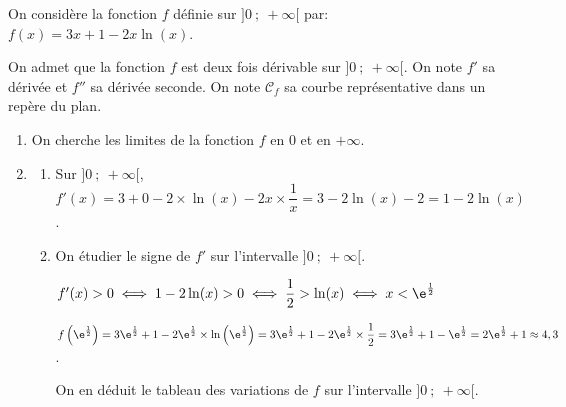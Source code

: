 \medskip

On considère la fonction $f$ définie sur $]0~;~+\infty[$ par: $f(x) = 3x + 1 - 2x \ln (x)$.

On admet que la fonction $f$ est deux fois dérivable sur $]0~;~+\infty[$. 
On note $f'$ sa dérivée et $f''$ sa dérivée seconde.
On note $\mathcal{C}_f$ sa courbe représentative dans un repère du plan.



\begin{enumerate}
\item On cherche les limites de la fonction $f$ en 0 et en $+\infty$.

\item 
	\begin{enumerate}
		\item 
Sur $]0~;~+\infty[$, $f'(x)=	3+0-2\times\ln(x) -2x\times \dfrac{1}{x}=3-2\ln(x)-2 = 1-2\ln(x)$.
		
		\item On étudier le signe de $f'$  sur l'intervalle $]0~;~+\infty[$.
		


$f'(x)>0 \iff 1-2\ln(x)>0 \iff \dfrac{1}{2}>\ln(x) \iff x<\e^{\frac{1}{2}}$

$f\left (\e^{\frac{1}{2}}\right ) = 3 \e^{\frac{1}{2}} +1 -2 \e^{\frac{1}{2}} \times \ln\left (\e^{\frac{1}{2}}\right ) = 3 \e^{\frac{1}{2}} +1 -2 \e^{\frac{1}{2}} \times \dfrac{1}{2} =
3 \e^{\frac{1}{2}} +1 -  \e^{\frac{1}{2}} = 2  \e^{\frac{1}{2}} +1 \approx 4,3$.

On en déduit le tableau des variations de $f$ sur l'intervalle $]0~;~+\infty[$.


\end{enumerate}
\end{enumerate}

